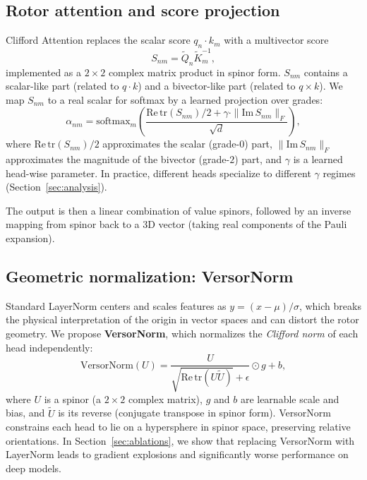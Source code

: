 \documentclass{article}
\theoremstyle{plain}
\theoremstyle{definition}
\theoremstyle{remark}
\begin{document}
\subsection{Rotor attention and score projection}

Clifford Attention replaces the scalar score $q_n \cdot k_m$ with a multivector score
\begin{equation}
    S_{nm} = \tilde{Q}_n \tilde{K}_m^{-1},
\end{equation}
implemented as a $2\times2$ complex matrix product in spinor form. $S_{nm}$ contains a scalar-like part (related to $q \cdot k$) and a bivector-like part (related to $q \times k$). We map $S_{nm}$ to a real scalar for softmax by a learned projection over grades:
\begin{equation}
    \alpha_{nm} = \mathrm{softmax}_m\left(
        \frac{\mathrm{Re}\,\mathrm{tr}(S_{nm})/2 + \gamma \cdot \|\mathrm{Im}\,S_{nm}\|_F}{\sqrt{d}}
    \right),
\end{equation}
where $\mathrm{Re}\,\mathrm{tr}(S_{nm})/2$ approximates the scalar (grade-$0$) part, $\|\mathrm{Im}\,S_{nm}\|_F$ approximates the magnitude of the bivector (grade-$2$) part, and $\gamma$ is a learned head-wise parameter. In practice, different heads specialize to different $\gamma$ regimes (Section~\ref{sec:analysis}).

The output is then a linear combination of value spinors, followed by an inverse mapping from spinor back to a 3D vector (taking real components of the Pauli expansion).

\subsection{Geometric normalization: VersorNorm}

Standard LayerNorm centers and scales features as $y = (x-\mu)/\sigma$, which breaks the physical interpretation of the origin in vector spaces and can distort the rotor geometry. We propose \textbf{VersorNorm}, which normalizes the \emph{Clifford norm} of each head independently:
\begin{equation}
    \mathrm{VersorNorm}(U) = \frac{U}{\sqrt{\mathrm{Re}\,\mathrm{tr}(U\tilde{U})} + \epsilon} \odot g + b,
\end{equation}
where $U$ is a spinor (a $2\times2$ complex matrix), $g$ and $b$ are learnable scale and bias, and $\tilde{U}$ is its reverse (conjugate transpose in spinor form). VersorNorm constrains each head to lie on a hypersphere in spinor space, preserving relative orientations. In Section~\ref{sec:ablations}, we show that replacing VersorNorm with LayerNorm leads to gradient explosions and significantly worse performance on deep models.
\end{document}
